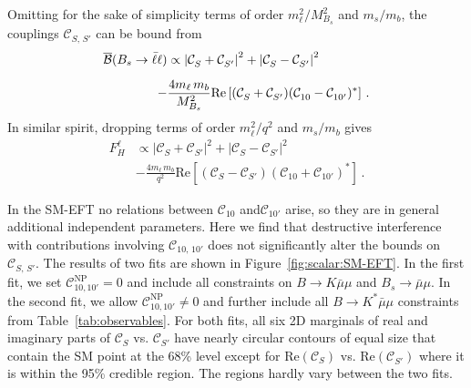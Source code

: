 \documentclass[twocolumn,epjc3]{svjour3}
\numberwithin{equation}{section}
\def \reffig#1{Figure~\ref{#1}}
\def \reftab#1{Table~\ref{#1}}
\newcommand{\wilson}[2][{}]{\mathcal{C}_{#2}^{\mathrm{#1}}}
\renewcommand{\[}{\big[}
\renewcommand{\]}{\big]}
\renewcommand{\(}{\big(}
\renewcommand{\)}{\big)}
\begin{document}
Omitting for the sake of simplicity terms of order $m_\ell^2/M_{B_s}^2$ and
$m_s/m_b$, the couplings $\wilson{S,\, S'}$ can be bound from~\cite{Alonso:2014csa}
\begin{equation}
\begin{aligned}
  \overline{\cal B}(B_s\to \bar\ell\ell) & \propto
      \left|\wilson{S} + \wilson{S'}\right|^2
    + \left|\wilson{S} - \wilson{S'}\right|^2
\\[0.2cm]
  - & \frac{4 m_\ell\, m_b}{M_{B_s}^2} \mbox{Re}
  \left[ (\wilson{S} + \wilson{S'})(\wilson{10} - \wilson{10'})^* \right] \,.
\end{aligned}
\end{equation}
In similar spirit, dropping terms of order $m_\ell^2/q^2$ and
$m_s/m_b$ gives
\begin{equation}
\begin{aligned}
  F_H^\ell & \propto
      \left|\wilson{S} + \wilson{S'}\right|^2
    + \left|\wilson{S} - \wilson{S'}\right|^2
\\[0.2cm]
  & - \frac{4 m_\ell\, m_b}{q^2} \mbox{Re}
  \left[ (\wilson{S} - \wilson{S'})(\wilson{10} + \wilson{10'})^* \right] \,.
\end{aligned}
\end{equation}

In the SM-EFT no relations between $\wilson{10}$ and$\wilson{10'}$ arise, 
so they are in general additional independent parameters. Here
we find that destructive interference with contributions involving
$\wilson{10,\, 10'}$ does not significantly alter the bounds on $\wilson{S,\,
  S'}$.  The results of two fits are shown in \reffig{fig:scalar:SM-EFT}. In the
first fit, we set $\wilson[NP]{10, 10'} = 0$ and include all constraints on
{$B \to K \bar\mu\mu$ and $B_s \to \bar\mu\mu$}. In the second fit, we allow
$\wilson[NP]{10, 10'} \ne 0$ and further include all {$B \to K^* \bar\mu\mu$}
constraints from \reftab{tab:observables}. For both fits, all six 2D marginals
of real and imaginary parts of $\wilson{S}$ vs. $\wilson{S'}$ have nearly
circular contours of equal size that contain the SM point at the 68\% level
except for $\mbox{Re}(\wilson{S})$ vs. $\mbox{Re}(\wilson{S'})$ where it is
within the 95\% credible region. The regions hardly vary between the two fits.
\end{document}
